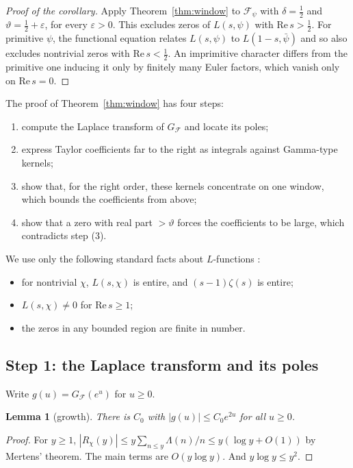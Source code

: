 \documentclass[11pt]{amsart}
\newtheorem{lemma}[theorem]{Lemma}
\theoremstyle{definition}
\theoremstyle{remark}
\begin{document}
\begin{proof}[Proof of the corollary]
Apply Theorem~\ref{thm:window} to $\mathcal F_\psi$ with $\delta=\tfrac12$ and $\vartheta=\tfrac12+\varepsilon$, for every $\varepsilon>0$. This excludes zeros of $L(s,\psi)$ with $\mathrm{Re}\,s>\tfrac12$. For primitive $\psi$, the functional equation relates $L(s,\psi)$ to $L(1-s,\bar\psi)$ and so also excludes nontrivial zeros with $\mathrm{Re}\,s<\tfrac12$. An imprimitive character differs from the primitive one inducing it only by finitely many Euler factors, which vanish only on $\mathrm{Re}\,s=0$.
\end{proof}

The proof of Theorem~\ref{thm:window} has four steps:
\begin{enumerate}[label=(\arabic*)]
\item compute the Laplace transform of $G_{\mathcal F}$ and locate its poles;
\item express Taylor coefficients far to the right as integrals against Gamma-type kernels;
\item show that, for the right order, these kernels concentrate on one window, which bounds the coefficients from above;
\item show that a zero with real part $>\vartheta$ forces the coefficients to be large, which contradicts step (3).
\end{enumerate}
We use only the following standard facts about $L$-functions \cite[Ch.~10--11]{MV}:
\begin{itemize}
\item for nontrivial $\chi$, $L(s,\chi)$ is entire, and $(s-1)\zeta(s)$ is entire;
\item $L(s,\chi)\neq0$ for $\mathrm{Re}\,s\ge1$;
\item the zeros in any bounded region are finite in number.
\end{itemize}

\subsection{Step 1: the Laplace transform and its poles}
Write $g(u)=G_{\mathcal F}(e^u)$ for $u\ge0$.

\begin{lemma}[growth]\label{lem:growth}
There is $C_0$ with $|g(u)|\le C_0e^{2u}$ for all $u\ge0$.
\end{lemma}

\begin{proof}
For $y\ge1$, $|R_\chi(y)|\le y\sum_{n\le y}\Lambda(n)/n\le y(\log y+O(1))$ by Mertens' theorem. The main terms are $O(y\log y)$. And $y\log y\le y^2$.
\end{proof}
\end{document}
